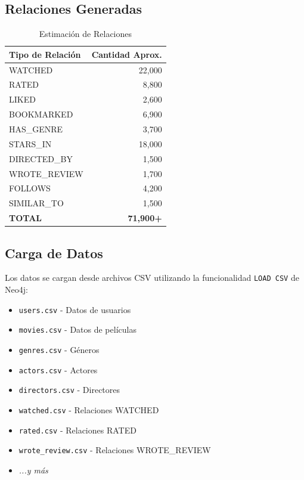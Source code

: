 \documentclass[12pt]{article}
\begin{document}
\subsection{Relaciones Generadas}

\begin{table}[h]
\centering
\begin{tabular}{|l|r|}
\hline
\textbf{Tipo de Relación} & \textbf{Cantidad Aprox.} \\
\hline
WATCHED & 22,000 \\
RATED & 8,800 \\
LIKED & 2,600 \\
BOOKMARKED & 6,900 \\
HAS\_GENRE & 3,700 \\
STARS\_IN & 18,000 \\
DIRECTED\_BY & 1,500 \\
WROTE\_REVIEW & 1,700 \\
FOLLOWS & 4,200 \\
SIMILAR\_TO & 1,500 \\
\hline
\textbf{TOTAL} & \textbf{71,900+} \\
\hline
\end{tabular}
\caption{Estimación de Relaciones}
\end{table}

\subsection{Carga de Datos}

Los datos se cargan desde archivos CSV utilizando la funcionalidad \texttt{LOAD CSV} de Neo4j:

\begin{itemize}
    \item \texttt{users.csv} - Datos de usuarios
    \item \texttt{movies.csv} - Datos de películas
    \item \texttt{genres.csv} - Géneros
    \item \texttt{actors.csv} - Actores
    \item \texttt{directors.csv} - Directores
    \item \texttt{watched.csv} - Relaciones WATCHED
    \item \texttt{rated.csv} - Relaciones RATED
    \item \texttt{wrote_review.csv} - Relaciones WROTE\_REVIEW
    \item \textit{...y más}
\end{itemize}
\end{document}
